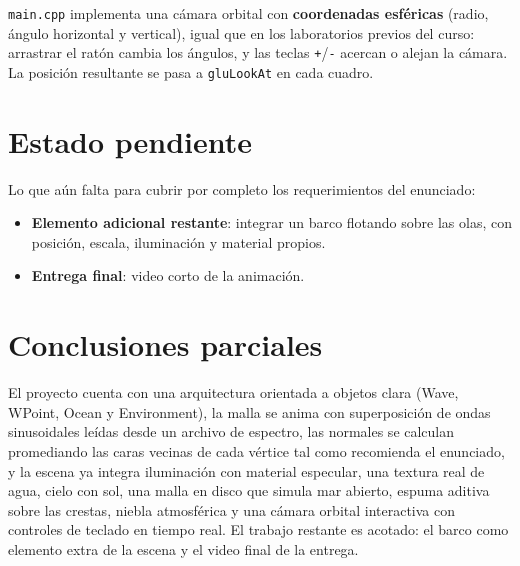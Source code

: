 ﻿\documentclass[11pt]{article}
\begin{document}
\texttt{main.cpp} implementa una cámara orbital con \textbf{coordenadas
esféricas} (radio, ángulo horizontal y vertical), igual que en los
laboratorios previos del curso: arrastrar el ratón cambia los ángulos, y las
teclas \texttt{+}/\texttt{-} acercan o alejan la cámara. La posición
resultante se pasa a \texttt{gluLookAt} en cada cuadro.

\section{Estado pendiente}
\label{sec:pendiente}

Lo que aún falta para cubrir por completo los requerimientos del enunciado:

\begin{itemize}
  \item \textbf{Elemento adicional restante}: integrar un barco flotando sobre
        las olas, con posición, escala, iluminación y material propios.
  \item \textbf{Entrega final}: video corto de la animación.
\end{itemize}

\section{Conclusiones parciales}

El proyecto cuenta con una arquitectura orientada a objetos clara (Wave,
WPoint, Ocean y Environment), la malla se anima con superposición de ondas sinusoidales
leídas desde un archivo de espectro, las normales se calculan promediando las
caras vecinas de cada vértice tal como recomienda el enunciado, y la escena
ya integra iluminación con material especular, una textura real de agua, cielo
con sol, una malla en disco que simula mar abierto, espuma aditiva sobre las
crestas, niebla atmosférica y una cámara orbital interactiva con controles de
teclado en tiempo real. El trabajo restante es acotado: el barco como elemento
extra de la escena y el video final de la entrega.
\end{document}
